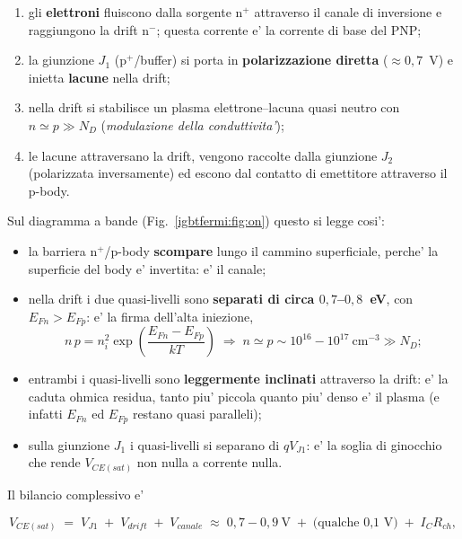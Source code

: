 \begin{enumerate}[nosep,leftmargin=1.6em]
  \item gli \textbf{elettroni} fluiscono dalla sorgente $\mathrm{n^{+}}$
        attraverso il canale di inversione e raggiungono la drift
        $\mathrm{n^{-}}$; questa corrente e' la corrente di base del PNP;
  \item la giunzione $J_1$ ($\mathrm{p^{+}}$/buffer) si porta in
        \textbf{polarizzazione diretta} ($\approx 0{,}7$~V) e inietta
        \textbf{lacune} nella drift;
  \item nella drift si stabilisce un plasma elettrone--lacuna quasi neutro con
        $n \simeq p \gg N_D$ (\emph{modulazione della conduttivita'});
  \item le lacune attraversano la drift, vengono raccolte dalla giunzione $J_2$
        (polarizzata inversamente) ed escono dal contatto di emettitore
        attraverso il p-body.
\end{enumerate}

Sul diagramma a bande (Fig.~\ref{igbtfermi:fig:on}) questo si legge cosi':

\begin{itemize}[nosep,leftmargin=1.4em]
  \item la barriera $\mathrm{n^{+}}$/p-body \textbf{scompare} lungo il cammino
        superficiale, perche' la superficie del body e' invertita: e' il canale;
  \item nella drift i due quasi-livelli sono \textbf{separati di circa
        $0{,}7$--$0{,}8$~eV}, con $E_{Fn}>E_{Fp}$: e' la firma dell'alta
        iniezione,
        \begin{equation}
        n\,p = n_i^2 \exp\!\left(\frac{E_{Fn}-E_{Fp}}{kT}\right)
        \;\Rightarrow\;
        n \simeq p \sim 10^{16}\!-\!10^{17}~\mathrm{cm^{-3}} \gg N_D;
        \end{equation}
  \item entrambi i quasi-livelli sono \textbf{leggermente inclinati} attraverso
        la drift: e' la caduta ohmica residua, tanto piu' piccola quanto piu'
        denso e' il plasma (e infatti $E_{Fn}$ ed $E_{Fp}$ restano quasi
        paralleli);
  \item sulla giunzione $J_1$ i quasi-livelli si separano di $qV_{J1}$: e' la
        soglia di ginocchio che rende $V_{CE(sat)}$ non nulla a corrente nulla.
\end{itemize}

Il bilancio complessivo e'

\begin{equation}
V_{CE(sat)} \;=\; V_{J1}\;+\;V_{drift}\;+\;V_{canale}
\;\approx\; 0{,}7\!-\!0{,}9~\mathrm{V} \;+\; \text{(qualche 0,1~V)} \;+\; I_C R_{ch},
\end{equation}


